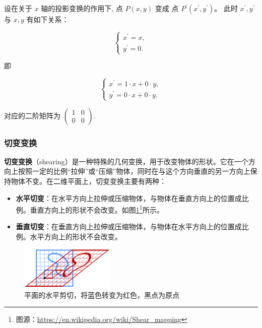 \documentclass[lang=cn,newtx,10pt,scheme=chinese]{elegantbook}
\begin{document}
设在关于 $x$ 轴的投影变换的作用下, 点 $P(x, y)$ 变成 点 $P^{\prime}\left(x^{\prime}, y^{\prime}\right)$。
此时 $x^{\prime}, y^{\prime}$ 与 $x, y$ 有如下关系：

$$
\left\{\begin{array}{l}
x^{\prime}=x, \\
y^{\prime}=0 .
\end{array}\right.
$$

即

$$
\left\{\begin{array}{l}
x^{\prime}= 1 \cdot x + 0 \cdot y, \\
y^{\prime}= 0 \cdot x + 0 \cdot y.
\end{array}\right.
$$

对应的二阶矩阵为 $\left(\begin{array}{ll}1 & 0 \\ 0 & 0\end{array}\right)$.

\subsubsection{切变变换}
\label{subsubsec:切变变换}

\textcolor{third}{\bf 切变变换}（shearing）是一种特殊的几何变换，用于改变物体的形状。它在一个方向上按照一定的比例“拉伸”或“压缩”物体，同时在与这个方向垂直的另一方向上保持物体不变。在二维平面上，切变变换主要有两种：

\begin{itemize}
    \item \textbf{水平切变}：在水平方向上拉伸或压缩物体，与物体在垂直方向上的位置成比例。垂直方向上的形状不会改变。如图\ref{fig:shearing-wiki}\footnote{图源：\url{https://en.wikipedia.org/wiki/Shear\_mapping}}所示。
    \item \textbf{垂直切变}：在垂直方向上拉伸或压缩物体，与物体在水平方向上的位置成比例。水平方向上的形状不会改变。
\end{itemize}


\begin{figure}[!h]
    \centering
    \includegraphics[width=0.4\textwidth]{figure/matrix/shearing.png}
    \caption{平面的水平剪切，将蓝色转变为红色，黑点为原点}
    \label{fig:shearing-wiki}
\end{figure}
\end{document}
